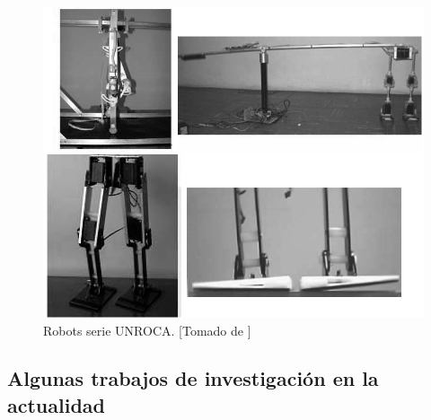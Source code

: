 \begin{figure}[!hbt]
  \centering
  \includegraphics[scale=0.4]{../images/unroca.png}
  \caption{Robots serie UNROCA. [Tomado de \cite{M2005}]}
  \label{fig:unroca}
\end{figure}

\subsection[Investigaci\'on actual]{Algunas trabajos de investigaci\'on en la actualidad }
\label{sec:algtra}


